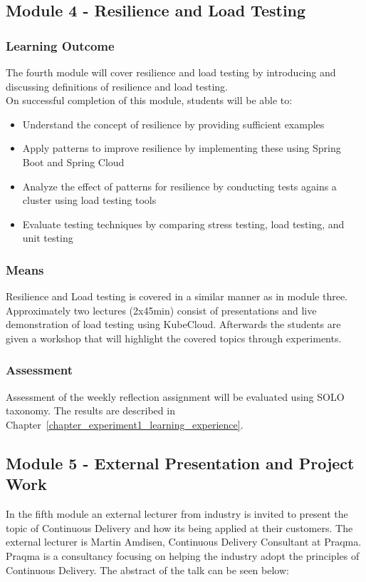 \subsection*{Module 4 - Resilience and Load Testing}

\subsubsection*{Learning Outcome}
The fourth module will cover resilience and load testing by introducing and discussing definitions of resilience and load testing. \\

\noindent
On successful completion of this module, students will be able to:
\begin{itemize}
        \item Understand the concept of resilience by providing sufficient examples
        \item Apply patterns to improve resilience by implementing these using Spring Boot and Spring Cloud
        \item Analyze the effect of patterns for resilience by conducting tests agains a cluster using load testing tools
        \item Evaluate testing techniques by comparing stress testing, load testing, and unit testing
    \end{itemize}
    
\subsubsection*{Means}
Resilience and Load testing is covered in a similar manner as in module three. Approximately two lectures (2x45min) consist of presentations and live demonstration of load testing using KubeCloud. Afterwards the students are given a workshop that will highlight the covered topics through experiments.

\subsubsection*{Assessment}
Assessment of the weekly reflection assignment will be evaluated using SOLO taxonomy. The results are described in Chapter~\ref{chapter_experiment1_learning_experience}. 

\subsection*{Module 5 - External Presentation and Project Work}
In the fifth module an external lecturer from industry is invited to present the topic of Continuous Delivery and how its being applied at their customers. The external lecturer is Martin Amdisen, Continuous Delivery Consultant at Praqma. Praqma is a consultancy focusing on helping the industry adopt the principles of Continuous Delivery. The abstract of the talk can be seen below: \\

